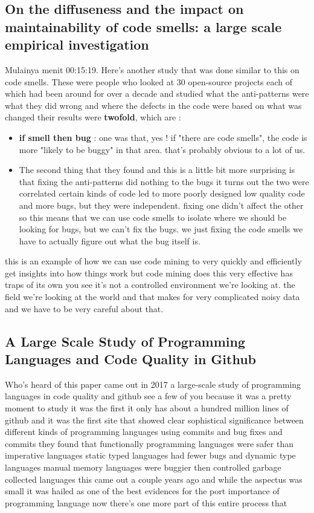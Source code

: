 \documentclass[14pt]{extreport}
\begin{document}
\subsection{On the diffuseness and the impact on maintainability of code smells: a large scale empirical investigation}
Mulainya menit 00:15:19.
Here's another study that was done similar to this on code smells.
These were people who looked at 30 open-source projects each of which had been around for over a decade and studied what the anti-patterns were what they did wrong and where the defects in the code were based on what was changed their results were \textbf{twofold}, which are : 
\begin{itemize}
	\item \textbf{if smell then bug} : one was that, yes ! if "there are code smells", the code is more "likely to be buggy" in that area. that's probably obvious to a lot of us. 
	\item The second thing that they found and this is a little bit more surprising is that fixing the anti-patterns did nothing to the bugs it turns out the two were correlated certain kinds of code led to more poorly designed low quality code and more bugs, but they were independent. fixing one didn't affect the other so this means that we can use code smells to isolate where we should be looking for bugs, but we can't fix the bugs. we just fixing the code smells we have to actually figure out what the bug itself is.
\end{itemize}

this is an example of how we can use code mining to very quickly and efficiently get insights into how things work but code mining does this very effective has traps of its own you see it's not a controlled environment we're looking at. the field we're looking at the world and that makes for very complicated noisy data and we have to be very careful about that.

\subsection{A Large Scale Study of Programming Languages and Code Quality in Github}
Who's heard of this paper came out in 2017 a large-scale study of programming languages in code quality and github see a few of you because it was a pretty moment to study it was the first it only has about a hundred million lines of github and it was the first site that showed clear sophistical significance between different kinds of programming languages using commits and bug fixes and commits they found that functionally programming languages were safer than imperative languages static typed languages had fewer bugs and dynamic type languages manual memory languages were buggier then controlled garbage collected languages this came out a couple years ago and while the aspectus was small it was hailed as one of the best evidences for the port importance of programming language now there's one more part of this entire process that 
\end{document}
